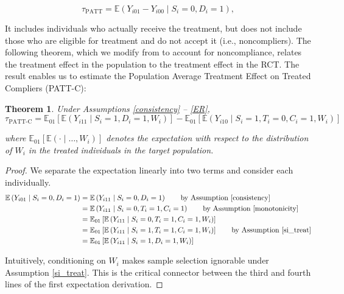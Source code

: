 \documentclass[hidelinks,12pt]{article}
\newtheorem{theorem}{Theorem}
\newcommand{\ex}{\mathbb{E}} %
\begin{document}
{\vskip 0.2in
\begin{equation}\label{tpatt}
\tau_{\text{PATT}} = \ex\left( Y_{i01} - Y_{i00} \mid S_i=0, D_i=1\right),
\end{equation}
\vskip 0.2in

It includes individuals who actually receive the treatment, but does not include those who are eligible for treatment and do not accept it (i.e., noncompliers). The following theorem, which we modify from \citet{Hartman} to account for noncompliance, relates the treatment effect in the population to the treatment effect in the RCT. {\color{red}The result enables us to estimate the Population Average Treatment Effect on Treated Compliers (PATT-C):}

\vskip 0.2in
\begin{theorem}\label{thm1}
Under Assumptions \ref{consistency} -- \ref{ER},
\begin{equation}\label{tpatt-est}
\tau_{\text{PATT-C}} = \ex_{01}\left[  \ex\left(Y_{i11} \mid S_i=1, D_i=1, W_i\right)\right]
-\ex_{01}\left[  \ex\left(Y_{i10} \mid S_i=1, T_i=0, C_i=1, W_i\right) \right] 
\end{equation}

where $\ex_{01}\left[\ex(\cdot \mid\dots, W_i)\right]$ denotes the expectation with respect to the distribution of $W_i$ in the treated individuals in the target population. 
\end{theorem}

\begin{proof}
We separate the expectation linearly into two terms and consider each individually.
\begin{align*}
\ex\left(Y_{i01} \mid S_i=0,D_i=1\right) &= \ex\left(Y_{i11} \mid S_i=0, D_i=1\right) \tag*{by Assumption \ref{consistency}} \\
&= \ex\left(Y_{i11} \mid S_i=0, T_i=1, C_i=1\right) \tag*{by Assumption \ref{monotonicity}} \\
&= \ex_{01}\left[  \ex\left(Y_{i11} \mid S_i=0, T_i=1, C_i=1, W_i\right) \right] \\
&= \ex_{01}\left[  \ex\left(Y_{i11} \mid S_i=1, T_i=1, C_i=1, W_i\right) \right] \tag*{by Assumption \ref{si_treat}} \\
&= \ex_{01}\left[  \ex\left(Y_{i11} \mid S_i=1, D_i=1, W_i\right)\right]
\end{align*}

{\color{red}Intuitively, conditioning on $W_i$ makes sample selection ignorable under Assumption \ref{si_treat}. This is the critical connector between the third and fourth lines of the first expectation derivation.}
	

\end{proof}}
\end{document}
